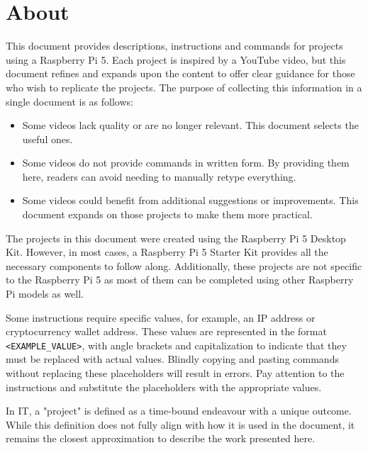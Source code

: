 \section*{ About}

This document provides descriptions, instructions and commands for projects using a Raspberry Pi 5. Each project is inspired by a YouTube video, but this document refines and expands upon the content to offer clear guidance for those who wish to replicate the projects. The purpose of collecting this information in a single document is as follows:

\begin{itemize}
\item Some videos lack quality or are no longer relevant. This document selects the useful ones.
\item Some videos do not provide commands in written form. By providing them here, readers can avoid needing to manually retype everything.
\item Some videos could benefit from additional suggestions or improvements. This document expands on those projects to make them more practical.
\end{itemize}

The projects in this document were created using the Raspberry Pi 5 Desktop Kit. However, in most cases, a Raspberry Pi 5 Starter Kit provides all the necessary components to follow along. Additionally, these projects are not specific to the Raspberry Pi 5 as most of them can be completed using other Raspberry Pi models as well.  

Some instructions require specific values, for example, an IP address or cryptocurrency wallet address. These values are represented in the format \texttt{\textless EXAMPLE\_VALUE\textgreater}, with angle brackets and capitalization to indicate that they must be replaced with actual values. Blindly copying and pasting commands without replacing these placeholders will result in errors. Pay attention to the instructions and substitute the placeholders with the appropriate values.

In IT, a "project" is defined as a time-bound endeavour with a unique outcome. While this definition does not fully align with how it is used in the document, it remains the closest approximation to describe the work presented here.